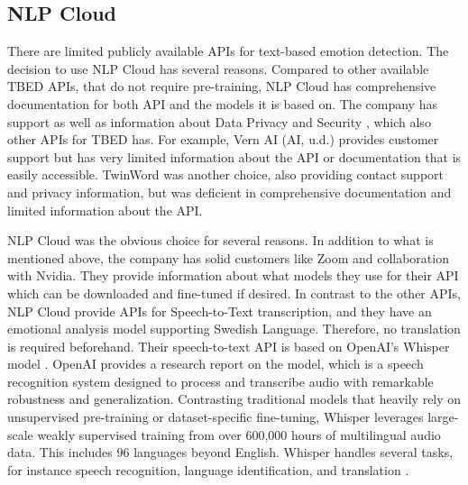\subsection{NLP Cloud}

There are limited publicly available APIs for text-based emotion detection. The decision to use NLP Cloud has several reasons. Compared to other available TBED APIs, that do not require pre-training, NLP Cloud has comprehensive documentation for both API and the models it is based on. The company has support as well as information about Data Privacy and Security \autocite{NLPCloud}, which also other APIs for TBED has. For example, Vern AI (AI, u.d.) provides customer support but has very limited information about the API or documentation that is easily accessible. TwinWord \autocite{TwinWord} was another choice, also providing contact support and privacy information, but was deficient in comprehensive documentation and limited information about the API. 

 NLP Cloud was the obvious choice for several reasons. In addition to what is mentioned above, the company has solid customers like Zoom and collaboration with Nvidia. They provide information about what models they use for their API which can be downloaded and fine-tuned if desired. In contrast to the other APIs, NLP Cloud provide APIs for Speech-to-Text transcription, and they have an emotional analysis model supporting Swedish Language. Therefore, no translation is required beforehand. Their speech-to-text API is based on OpenAI’s Whisper model \autocite{NLPCloud}. OpenAI provides a research report on the model, which is a speech recognition system designed to process and transcribe audio with remarkable robustness and generalization. Contrasting traditional models that heavily rely on unsupervised pre-training or dataset-specific fine-tuning, Whisper leverages large-scale weakly supervised training from over 600,000 hours of multilingual audio data. This includes 96 languages beyond English. Whisper handles several tasks, for instance speech recognition, language identification, and translation \autocite{Radford2022}. 

